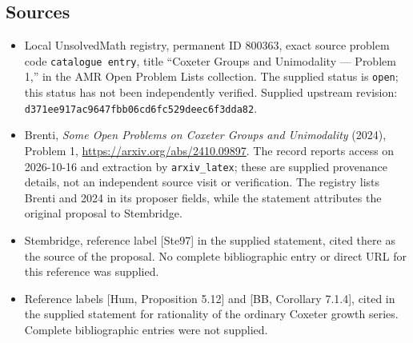 \documentclass[11pt]{article}
\begin{document}
\subsection{Sources}
\begin{itemize}
\item Local UnsolvedMath registry, permanent ID \(800363\), exact source problem code \texttt{catalogue entry}, title ``Coxeter Groups and Unimodality --- Problem 1,'' in the AMR Open Problem Lists collection. The supplied status is \texttt{open}; this status has not been independently verified. Supplied upstream revision: \texttt{d371ee917ac9647fbb06cd6fc529deec6f3dda82}.
\item Brenti, \emph{Some Open Problems on Coxeter Groups and Unimodality} (2024), Problem 1, \url{https://arxiv.org/abs/2410.09897}. The record reports access on 2026-10-16 and extraction by \texttt{arxiv\_latex}; these are supplied provenance details, not an independent source visit or verification. The registry lists Brenti and 2024 in its proposer fields, while the statement attributes the original proposal to Stembridge.
\item Stembridge, reference label [Ste97] in the supplied statement, cited there as the source of the proposal. No complete bibliographic entry or direct URL for this reference was supplied.
\item Reference labels [Hum, Proposition 5.12] and [BB, Corollary 7.1.4], cited in the supplied statement for rationality of the ordinary Coxeter growth series. Complete bibliographic entries were not supplied.
\end{itemize}
\end{document}
